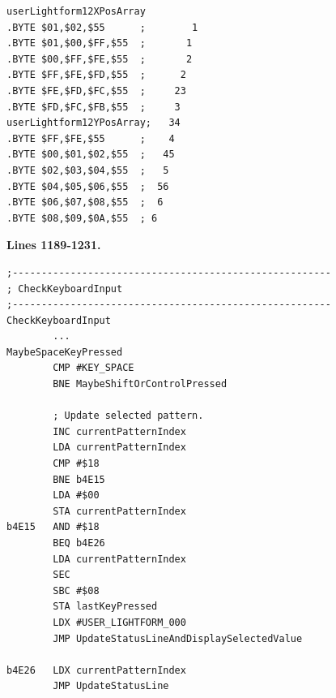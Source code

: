 \begin{minipage}[b]{0.48\linewidth}
\begin{lrbox}{\mybox}%
\begin{lstlisting}[basicstyle=\ttfamily\tiny,escapechar=\%]
userLightform12XPosArray
.BYTE $01,$02,$55      ;        1
.BYTE $01,$00,$FF,$55  ;       1 
.BYTE $00,$FF,$FE,$55  ;       2 
.BYTE $FF,$FE,$FD,$55  ;      2  
.BYTE $FE,$FD,$FC,$55  ;     23  
.BYTE $FD,$FC,$FB,$55  ;     3   
userLightform12YPosArray;   34  
.BYTE $FF,$FE,$55      ;    4   
.BYTE $00,$01,$02,$55  ;   45   
.BYTE $02,$03,$04,$55  ;   5    
.BYTE $04,$05,$06,$55  ;  56    
.BYTE $06,$07,$08,$55  ;  6     
.BYTE $08,$09,$0A,$55  ; 6      
\end{lstlisting}
\end{lrbox}%
\scalebox{0.8}{\usebox{\mybox}}

\end{minipage}
%
\clearpage
\textbf{Lines 1189-1231. } 
\begin{lstlisting}[basicstyle=\ttfamily\scriptsize]
;-------------------------------------------------------
; CheckKeyboardInput
;-------------------------------------------------------
CheckKeyboardInput   
        ...
MaybeSpaceKeyPressed   
        CMP #KEY_SPACE
        BNE MaybeShiftOrControlPressed

        ; Update selected pattern.
        INC currentPatternIndex
        LDA currentPatternIndex
        CMP #$18
        BNE b4E15
        LDA #$00
        STA currentPatternIndex
b4E15   AND #$18
        BEQ b4E26
        LDA currentPatternIndex
        SEC 
        SBC #$08
        STA lastKeyPressed
        LDX #USER_LIGHTFORM_000
        JMP UpdateStatusLineAndDisplaySelectedValue

b4E26   LDX currentPatternIndex
        JMP UpdateStatusLine
\end{lstlisting}
\clearpage

